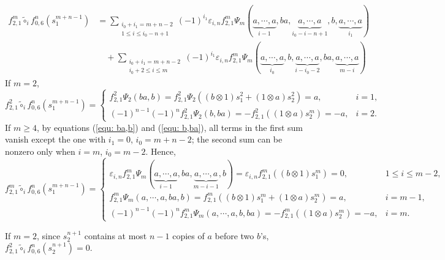 \documentclass[10pt, reqno]{amsart}
\theoremstyle{definition}
\theoremstyle{remark}
\numberwithin{equation}{section}
\begin{document}
\[\begin{aligned}
    f_{2,1}^m\tilde{\circ}_i f_{0,6}^n(s_1^{m+n-1}) &=\sum_{\substack{i_0+i_1=m+n-2\\ 1\le i\le i_0-n+1}}(-1)^{i_1}\varepsilon_{i,n} f_{2,1}^m\Psi_m(\underbrace{a,\cdots,a}_{i-1},ba,\underbrace{a,\cdots,a}_{i_0-i-n+1},b,\underbrace{a,\cdots,a}_{i_1})\\
     & \quad +\sum_{\substack{i_0+i_1=m+n-2\\ i_0+2\le i\le m}}(-1)^{i_1}\varepsilon_{i,n} f_{2,1}^m\Psi_m(\underbrace{a,\cdots,a}_{i_0},b,\underbrace{a,\cdots,a}_{i-i_0-2},ba,\underbrace{a,\cdots,a}_{m-i})
\end{aligned}\]
If \(m=2\),
\[f_{2,1}^2\tilde{\circ}_i f_{0,6}^n(s_1^{m+n-1})=\begin{cases}
    f_{2,1}^2\Psi_2(ba, b)= f_{2,1}^2\Psi_2((b\otimes 1)s_1^2+(1\otimes a)s_2^2)= a, & i=1, \\
   (-1)^{n-1}(-1)^n f_{2,1}^2\Psi_2(b, ba)= - f_{2,1}^2((1\otimes a)s_2^m)=-a, & i=2.
\end{cases}\]
If \(m\ge 4\), by equations (\ref{equ: ba,b}) and (\ref{equ: b,ba}), all terms in the first sum vanish except the one with \(i_1=0\), \(i_0=m+n-2\); the second sum can be nonzero only when \(i=m\), \(i_0=m-2\). Hence,
\[f_{2,1}^m\tilde{\circ}_i f_{0,6}^n(s_1^{m+n-1})     
   =\begin{cases}
        \varepsilon_{i,n} f_{2,1}^m\Psi_m(\underbrace{a,\cdots,a}_{i-1},ba,\underbrace{a,\cdots,a}_{m-i-1},b)= \varepsilon_{i,n}f_{2,1}^m((b\otimes1)s_1^m)=0, & 1\le i \le m-2,\\
         f_{2,1}^m\Psi_m(a,\cdots,a,ba,b)=f_{2,1}^m((b\otimes1)s_1^m+(1\otimes a)s_2^m)=a, & i=m-1,\\
          (-1)^{n-1}(-1)^nf_{2,1}^m\Psi_m(a,\cdots,a,b,ba)=-f_{2,1}^m((1\otimes a)s_2^m)=-a, & i=m.
     \end{cases}\]

If \(m=2\), since \(s_2^{n+1}\) contains at most \(n-1\) copies of \(a\) before two \(b\)'s, \(f_{2,1}^2\tilde{\circ}_i f_{0,6}^n(s_2^{n+1})=0\). 
\end{document}
